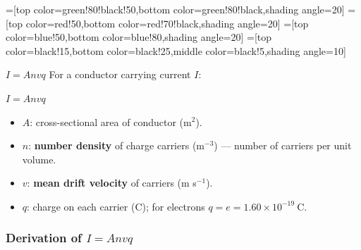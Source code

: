 =[top color=green!80!black!50,bottom color=green!80!black,shading angle=20]
=[top color=red!50,bottom color=red!70!black,shading angle=20]
=[top color=blue!50,bottom color=blue!80,shading angle=20]
=[top color=black!15,bottom color=black!25,middle color=black!5,shading angle=10]






\begin{formulabox}{{$I = Anvq$}}
For a conductor carrying current $I$:
\begin{center}
\Large $I = Anvq$
\end{center}
\vspace{0.3em}
\begin{itemize}[itemsep=2pt]
  \item $A$: cross-sectional area of conductor (m$^2$).
  \item $n$: \textbf{number density} of charge carriers (m$^{-3}$) — number of carriers per unit volume.
  \item $v$: \textbf{mean drift velocity} of carriers (m s$^{-1}$).
  \item $q$: charge on each carrier (C); for electrons $q = e = 1.60\times10^{-19}\ \text{C}$.
\end{itemize}
\end{formulabox}


\pagebreak

\subsubsection*{Derivation of $I = Anvq$}

